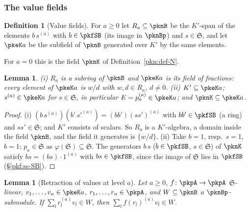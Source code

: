 \documentclass[10pt]{amsart}
\newtheorem{lemma}[theorem]{Lemma}
\theoremstyle{definition}
\newtheorem{definition}[theorem]{Definition}
\theoremstyle{remark}
\begin{document}
\subsubsection{The value fields}\label{pke:ss-fields}

\begin{definition}[Value fields]\label{pke:def-K}
For $a\ge0$ let $R_a\subseteq\pknB$ be the $K'$-span of the elements $b\,s^{(a)}$ with $b\in\pkfSB$ (its
image in $\pknBp$) and $s\in\mathfrak S$, and let $\pkeK a$ be the subfield of $\pknB$ generated over
$K'$ by the same elements.
\end{definition}

For $a=0$ this is the field $\pknK$ of Definition~\ref{pkn:def-N}.

\begin{lemma}\label{pke:K-basic}
(i) $R_a$ is a subring of $\pknB$ and $\pkeK a$ is its field of fractions: every element of $\pkeK a$ is
$w/d$ with $w,d\in R_a$, $d\ne0$. (ii) $K'\subseteq\pkeK a$; $s^{(a)}\in\pkeK a$ for $s\in\mathfrak S$, in
particular $E=p_a^{(a)}\in\pkeK a$; and $\pknK\subseteq\pkeK a$.
\end{lemma}

\begin{proof}
(i) $(b\,s^{(a)})(b'\,s'^{(a)})=(bb')(ss')^{(a)}$ with $bb'\in\pkfSB$ (a ring) and $ss'\in\mathfrak S$; and
$K'$ consists of scalars. So $R_a$ is a $K'$-algebra, a domain inside the field $\pknB$, and the field it
generates is $\{w/d\}$. (ii) Take $b=1$, resp.\ $s=1$, $b=1$; $p_a\in\mathfrak S$ as $\varphi(\mathfrak S)
\subseteq\mathfrak S$. The generators $b\,s$ ($b\in\pkfSB$, $s\in\mathfrak S$) of $\pknK$ satisfy
$bs=(bs)\cdot1^{(a)}$ with $bs\in\pkfSB$, since the image of $\mathfrak S$ lies in $\pkfSB$
(\S\ref{pkf:ss-SB}).
\end{proof}

\begin{lemma}[Retraction of values at level $a$]\label{pke:valret}
Let $a\ge0$, $f\colon\pkpA\to\pkpA$ $\mathfrak S$-linear, $v_1,\dots,v_n\in\pkeK a$, $r_1,\dots,r_n\in\pkpA$,
and $W\subseteq\pknB$ a $\pknBp$-submodule. If $\sum_lr_l^{(a)}v_l\in W$, then $\sum_lf(r_l)^{(a)}v_l\in W$.
\end{lemma}
\end{document}
